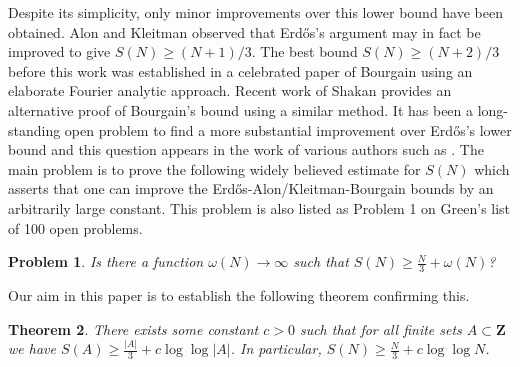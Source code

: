 \documentclass[11pt, reqno]{amsart}
\newtheorem{theorem}{Theorem}[section]
\newtheorem{prob}[theorem]{Problem}
\begin{document}
Despite its simplicity, only minor improvements over this lower bound have been obtained. Alon and Kleitman \cite{alonkleitman} observed that Erd\H{o}s's argument may in fact be improved to give $S(N)\geqslant (N+1)/3$. The best bound $S(N)\geqslant (N+2)/3$ before this work was established in a celebrated paper of Bourgain \cite{bourgain} using an elaborate Fourier analytic approach. Recent work of Shakan \cite{shakan} provides an alternative proof of Bourgain's bound using a similar method. It has been a long-standing open problem to find a more substantial improvement over Erd\H{o}s's lower bound and this question appears in the work of various authors such as \cite{alonkleitman, bourgain, eberhardgreenmanners,erdos, guy, jingwu1, jingwu2,lewko,shakan,taovu,taovubook}. The main problem is to prove the following widely believed estimate for $S(N)$ which asserts that one can improve the Erd\H{o}s-Alon/Kleitman-Bourgain bounds by an arbitrarily large constant. This problem is also listed as Problem 1 on Green's list \cite{green} of 100 open problems.
\begin{prob}\label{conj:sumfree}
    Is there a function $\omega(N)\to\infty$ such that $S(N)\geqslant \frac{N}{3}+\omega(N)$?
\end{prob}  
Our aim in this paper is to establish the following theorem confirming this. 
\begin{theorem}\label{th:main}
    There exists some constant $c>0$ such that for all finite sets $A\subset\mathbf{Z}$ we have $S(A)\geqslant \frac{|A|}{3}+c\log \log |A|$. In particular, $S(N)\geqslant \frac{N}{3}+c\log\log N$.
\end{theorem}
\end{document}
